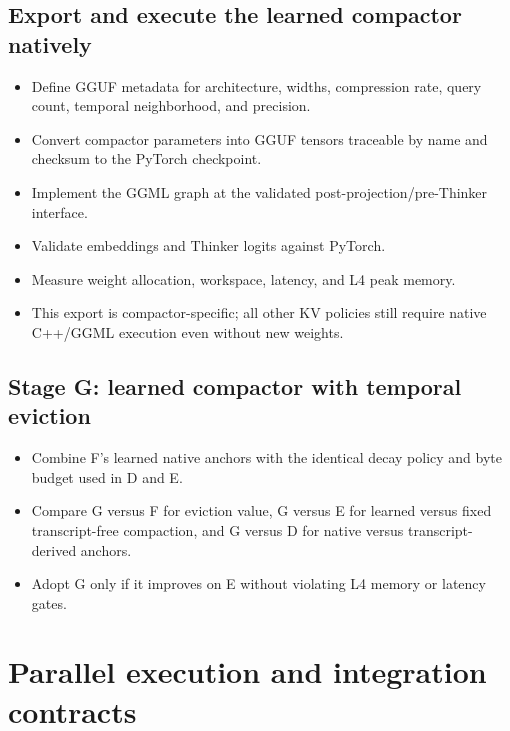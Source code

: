 \documentclass[10pt,letterpaper]{article}
\begin{document}
\subsection{Export and execute the learned compactor natively}
\begin{itemize}
    \item Define GGUF metadata for architecture, widths, compression rate, query count, temporal neighborhood, and precision.
    \item Convert compactor parameters into GGUF tensors traceable by name and checksum to the PyTorch checkpoint.
    \item Implement the GGML graph at the validated post-projection/pre-Thinker interface.
    \item Validate embeddings and Thinker logits against PyTorch.
    \item Measure weight allocation, workspace, latency, and L4 peak memory.
    \item This export is compactor-specific; all other KV policies still require native C++/GGML execution even without new weights.
\end{itemize}

\subsection{Stage G: learned compactor with temporal eviction}
\begin{itemize}
    \item Combine F's learned native anchors with the identical decay policy and byte budget used in D and E.
    \item Compare G versus F for eviction value, G versus E for learned versus fixed transcript-free compaction, and G versus D for native versus transcript-derived anchors.
    \item Adopt G only if it improves on E without violating L4 memory or latency gates.
\end{itemize}

\section{Parallel execution and integration contracts}
\end{document}
